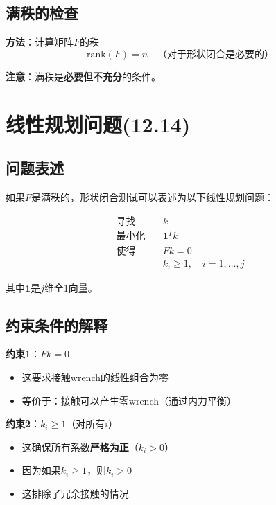 \documentclass[12pt,a4paper]{article}
\begin{document}
\subsection{满秩的检查}

\textbf{方法}：计算矩阵$F$的秩
\begin{equation}
\text{rank}(F) = n \quad \text{（对于形状闭合是必要的）}
\end{equation}

\textbf{注意}：满秩是\textbf{必要但不充分}的条件。

\section{线性规划问题(12.14)}

\subsection{问题表述}

如果$F$是满秩的，形状闭合测试可以表述为以下线性规划问题：

\begin{align}
\text{寻找} \quad & k \\
\text{最小化} \quad & \mathbf{1}^T k \\
\text{使得} \quad & F k = 0 \\
& k_i \geq 1, \quad i = 1, \ldots, j
\label{eq:LP_form_closure}
\end{align}

其中$\mathbf{1}$是$j$维全1向量。

\subsection{约束条件的解释}

\textbf{约束1}：$F k = 0$
\begin{itemize}
\item 这要求接触wrench的线性组合为零
\item 等价于：接触可以产生零wrench（通过内力平衡）
\end{itemize}

\textbf{约束2}：$k_i \geq 1$（对所有$i$）
\begin{itemize}
\item 这确保所有系数\textbf{严格为正}（$k_i > 0$）
\item 因为如果$k_i \geq 1$，则$k_i > 0$
\item 这排除了冗余接触的情况
\end{itemize}
\end{document}
